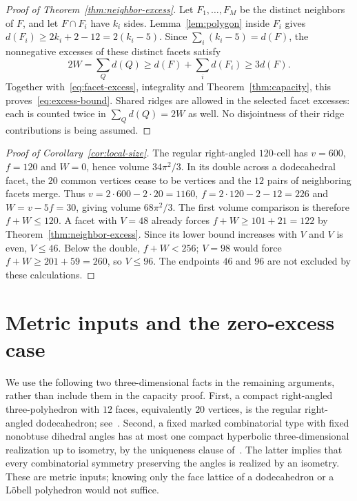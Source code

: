 \documentclass[11pt]{article}
\theoremstyle{remark}
\begin{document}
\begin{proof}[Proof of Theorem~\ref{thm:neighbor-excess}]
Let $F_1,\ldots,F_M$ be the distinct neighbors of $F$, and let
$F\cap F_i$ have $k_i$ sides. Lemma~\ref{lem:polygon} inside $F_i$
gives $d(F_i)\ge2k_i+2-12=2(k_i-5)$. Since
$\sum_i(k_i-5)=d(F)$, the nonnegative excesses of these distinct
facets satisfy
\[
 2W=\sum_Qd(Q)\ge d(F)+\sum_i d(F_i)\ge3d(F).
\]
Together with~\eqref{eq:facet-excess}, integrality and
Theorem~\ref{thm:capacity}, this proves~\eqref{eq:excess-bound}.
Shared ridges are allowed in the selected facet excesses: each is
counted twice in $\sum_Qd(Q)=2W$ as well. No disjointness of their
ridge contributions is being assumed.
\end{proof}

\begin{proof}[Proof of Corollary~\ref{cor:local-size}]
The regular right-angled $120$-cell has $v=600$, $f=120$ and $W=0$,
hence volume $34\pi^2/3$. In its double across a dodecahedral facet,
the $20$ common vertices cease to be vertices and the $12$ pairs of
neighboring facets merge. Thus $v=2\cdot600-2\cdot20=1160$,
$f=2\cdot120-2-12=226$ and $W=v-5f=30$, giving volume $68\pi^2/3$.
The first volume comparison is therefore $f+W\le120$. A facet with
$V=48$ already forces $f+W\ge101+21=122$ by
Theorem~\ref{thm:neighbor-excess}. Since its lower bound increases
with $V$ and $V$ is even, $V\le46$. Below the double,
$f+W<256$; $V=98$ would force $f+W\ge201+59=260$, so $V\le96$.
The endpoints $46$ and $96$ are not excluded by these calculations.
\end{proof}

\section{Metric inputs and the zero-excess case}\label{sec:metric}

We use the following two three-dimensional facts in the remaining
arguments, rather than include them in the capacity proof.
First, a compact right-angled three-polyhedron with $12$ faces,
equivalently $20$ vertices, is the regular right-angled dodecahedron;
see~\cite[Section~1.2]{ABVE}. Second, a fixed marked combinatorial
type with fixed nonobtuse dihedral angles has at most one compact
hyperbolic three-dimensional realization up to isometry, by the
uniqueness clause of~\cite[Theorem~1.4]{RHD}. The latter implies that
every combinatorial symmetry preserving the angles is realized by
an isometry. These are metric inputs; knowing only the face lattice
of a dodecahedron or a L\"obell polyhedron would not suffice.
\end{document}
